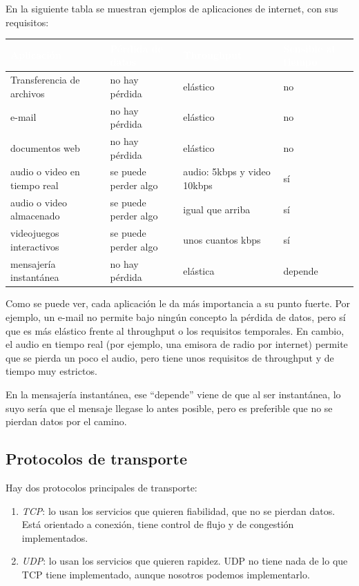 \documentclass[10pt,a4paper,spanish]{report}
\begin{document}
En la siguiente tabla se muestran ejemplos de aplicaciones de internet, con sus requisitos:

{
\begin{tabular}{|l|p{3cm}|p{2.5cm}|l|}
\hline
 \rowcolor{tema2}\textcolor{white}{Aplicación} & \textcolor{white}{Pérdida de datos} & \textcolor{white}{Throughput} & \textcolor{white}{Sensible al tiempo} \\
 \hline
 Transferencia de archivos & no hay pérdida & elástico & no \\
 \hline
 e-mail & no hay pérdida & elástico & no \\
 \hline
 documentos web & no hay pérdida & elástico & no \\
 \hline
 audio o video en tiempo real & se puede perder algo & audio: 5kbps y video 10kbps & sí \\
 \hline
 audio o video almacenado & se puede perder algo & igual que arriba & sí \\
 \hline
 videojuegos interactivos & se puede perder algo & unos cuantos kbps & sí \\
 \hline
 mensajería instantánea & no hay pérdida & elástica & depende \\
 \hline
\end{tabular}
}


Como se puede ver, cada aplicación le da más importancia a su punto fuerte. Por ejemplo, un e-mail no permite bajo ningún concepto la pérdida de datos, pero sí que es más elástico frente al throughput o los requisitos temporales. En cambio, el audio en tiempo real (por ejemplo, una emisora de radio por internet) permite que se pierda un poco el audio, pero tiene unos requisitos de throughput y de tiempo muy estrictos.

En la mensajería instantánea, ese ``depende'' viene de que al ser instantánea, lo suyo sería que el mensaje llegase lo antes posible, pero es preferible que no se pierdan datos por el camino.

\subsection{\textcolor{tema2}Protocolos de transporte}
Hay dos protocolos principales de transporte:
\begin{enumerate}[\color{tema2}{$\triangle$}]
  \item \textit{\textcolor{tema2}{TCP}}: lo usan los servicios que quieren fiabilidad, que no se pierdan datos. Está orientado a conexión, tiene control de flujo y de congestión implementados.

  \item \textit{\textcolor{tema2}{UDP}}: lo usan los servicios que quieren rapidez. UDP no tiene nada de lo que TCP tiene implementado, aunque nosotros podemos implementarlo.
\end{enumerate}
\end{document}
